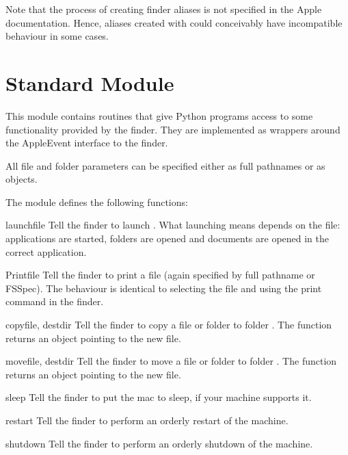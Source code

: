 Note that the process of creating finder aliases is not specified in
the Apple documentation. Hence, aliases created with 
could conceivably have incompatible behaviour in some cases.

\section{Standard Module }

This module contains routines that give Python programs access to some
functionality provided by the finder. They are implemented as wrappers
around the AppleEvent interface to the finder.

All file and folder parameters can be specified either as full
pathnames or as  objects.

The  module defines the following functions:


\begin{funcdesc}{launch}{file}
Tell the finder to launch . What launching means depends on the file:
applications are started, folders are opened and documents are opened
in the correct application.
\end{funcdesc}

\begin{funcdesc}{Print}{file}
Tell the finder to print a file (again specified by full pathname or
FSSpec). The behaviour is identical to selecting the file and using
the print command in the finder.
\end{funcdesc}

\begin{funcdesc}{copy}{file, destdir}
Tell the finder to copy a file or folder  to folder
. The function returns an  object pointing to
the new file.
\end{funcdesc}

\begin{funcdesc}{move}{file, destdir}
Tell the finder to move a file or folder  to folder
. The function returns an  object pointing to
the new file.
\end{funcdesc}

\begin{funcdesc}{sleep}{}
Tell the finder to put the mac to sleep, if your machine supports it.
\end{funcdesc}

\begin{funcdesc}{restart}{}
Tell the finder to perform an orderly restart of the machine.
\end{funcdesc}

\begin{funcdesc}{shutdown}{}
Tell the finder to perform an orderly shutdown of the machine.
\end{funcdesc}

